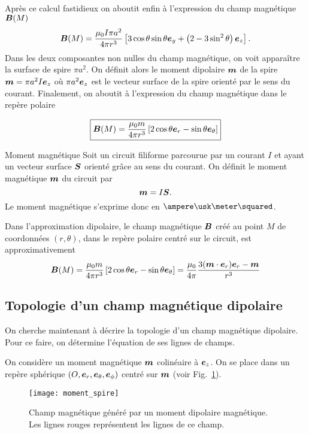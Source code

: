 	Après ce calcul fastidieux on aboutit enfin à l'expression du champ magnétique
	$\vecb(M)$
		\begin{equation*}
			\vecb(M) = \dfrac{\mu_0 I \pi a^2}{4 \pi r^3}
			\left[3\cos\theta\sin\theta\ey + \left(2 - 3 \sin^2\theta\right)\ez
			\right].
		\end{equation*}
	Dans les deux composantes non nulles du champ magnétique, on voit apparaître
	la surface de spire $\pi a ^2$. On définit alors le moment dipolaire $\vecm$
	de la spire $\vecm = \pi a^2 I \ez$ où $\pi a^2 \ez$ est le vecteur surface de la 
	spire orienté par le sens du courant. Finalement, on aboutit à l'expression du champ
	magnétique dans le repère polaire

		\begin{equation}
			\boxed{\vecb(M) = \dfrac{\mu_0 m}{4 \pi r^3} 
			\left[2\cos\theta\er - \sin \theta\etheta\right]}
		\end{equation}

	\begin{defn}{Moment magnétique}
		Soit un circuit filiforme parcourue par un courant $I$ et ayant 
		un vecteur surface $\vecs$ orienté grâce au sens du courant. On 
		définit le moment magnétique $\vecm$ du circuit par
		\begin{equation*}
			\vecm = I\vecs.
		\end{equation*}
		Le moment magnétique s'exprime donc en $\ampere \usk
		\meter \squared$.

		Dans l'approximation dipolaire, le champ magnétique $\vecb$ créé au point
		$M$ de coordonnées $(r, \theta)$, dans le repère polaire centré 
		sur le circuit, est approximativement
		\begin{equation*}
			\vecb(M) = \dfrac{\mu_0 m}{4 \pi r^3} 
			\left[2\cos\theta\er - \sin\theta\etheta\right]
			= \dfrac{\mu_0}{4 \pi} \dfrac{3(\vecm \cdot \er)\er - \vecm}
			{r^3}
		\end{equation*}
	\end{defn}
	
	\subsection{Topologie d'un champ magnétique dipolaire}
	On cherche maintenant à décrire la topologie d'un champ magnétique
	dipolaire. Pour ce faire, on détermine l'équation de ses lignes de champs.

	On considère un moment magnétique $\vecm$ colinéaire à $\ez$. On se place
	dans un repère sphérique $(O, \er, \etheta, \ephi)$ centré sur $\vecm$ 
	(voir Fig.~\ref{fig:aimant_moment_spire}). 
	\begin{figure}[htpb]
		\centering
		\texttt{[image: moment\_spire]}
		\caption{Champ magnétique généré par un moment dipolaire 
		magnétique. Les lignes rouges représentent les lignes de ce 
		champ.}%
		\label{fig:aimant_moment_spire}
	\end{figure}
	
